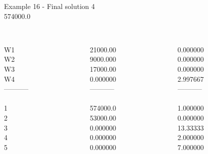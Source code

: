 \begin{frame}{Example 16 - Final solution}
\footnotesize
{}  4\\
  574000.0\\

\begin{columns}[t]
\begin{column}{0.3\textwidth}

\\
W1\\
W2\\
W3\\
W4\\
-----------\\
\\
1\\
2\\
3\\
4\\
5\\

\end{column}
\begin{column}{0.3\textwidth}

\\
21000.00\\
9000.000\\
17000.00\\
0.000000\\


-----------\\
\\
574000.0\\
53000.00\\
0.000000\\
0.000000\\
0.000000\\

\end{column}  

\begin{column}{0.3\textwidth}

\\
0.000000\\
0.000000\\
0.000000\\
2.997667\\

-----------\\
\\
1.000000\\
0.000000\\
13.33333\\
2.000000\\
7.000000\\
\end{column}
\end{columns}
\end{frame}
